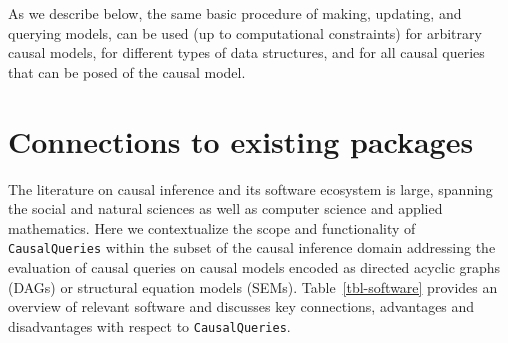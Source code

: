 \documentclass[
  11pt,
  article]{jss}
\begin{document}
As we describe below, the same basic procedure of making, updating, and
querying models, can be used (up to computational constraints) for
arbitrary causal models, for different types of data structures, and for
all causal queries that can be posed of the causal model.

\hypertarget{connections-to-existing-packages}{%
\section{Connections to existing
packages}\label{connections-to-existing-packages}}

The literature on causal inference and its software ecosystem is large,
spanning the social and natural sciences as well as computer science and
applied mathematics. Here we contextualize the scope and functionality
of \texttt{CausalQueries} within the subset of the causal inference
domain addressing the evaluation of causal queries on causal models
encoded as directed acyclic graphs (DAGs) or structural equation models
(SEMs). Table~\ref{tbl-software} provides an overview of relevant
software and discusses key connections, advantages and disadvantages
with respect to \texttt{CausalQueries}.
\end{document}
